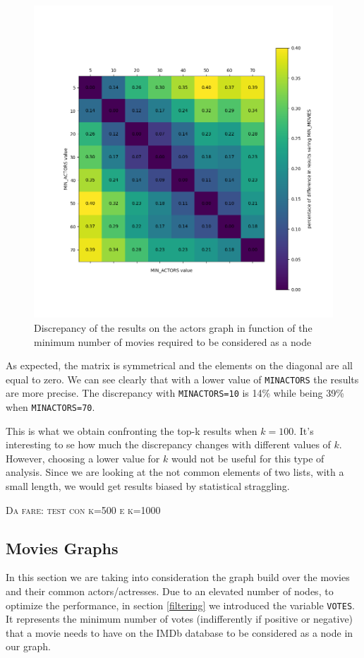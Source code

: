 \begin{figure}[h!] \label{matrix-a}
    \centering
    \includegraphics[width=11.5cm]{Figure_1.png}
    \caption{Discrepancy of the results on the actors graph in function of the minimum number of movies required to be considered as a node}
\end{figure}

\nd As expected, the matrix is symmetrical and the elements on the diagonal are all equal to zero. We can see clearly that with a lower value of \texttt{MIN\textunderscore ACTORS} the results are more precise. The discrepancy with \texttt{MIN\textunderscore ACTORS=10} is 14\% while being 39\% when \texttt{MIN\textunderscore ACTORS=70}. \s

\nd This is what we obtain confronting the top-k results when $k=100$. It's interesting to se how much the discrepancy changes with different values of $k$. However, choosing a lower value for $k$ would not be useful for this type of analysis. Since we are looking at the not common elements of two lists, with a small length, we would get results biased by statistical straggling. \s

\textsc{Da fare: test con k=500 e k=1000}

\s
\newpage
\subsection{Movies Graphs}
In this section we are taking into consideration the graph build over the movies and their common actors/actresses. Due to an elevated number of nodes, to optimize the performance, in section \ref{filtering} we introduced the variable \texttt{VOTES}. It represents the minimum number of votes (indifferently if positive or negative) that a movie needs to have on the IMDb database to be considered as a node in our graph.

